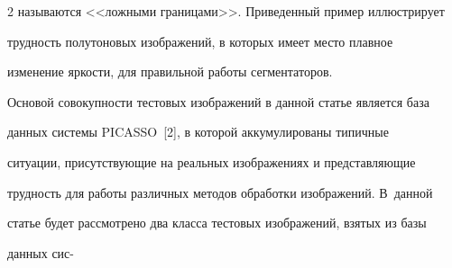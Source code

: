 \begin{multicols}{2}
называются <<ложными границами>>. Приведенный пример иллюстрирует 


трудность полутоновых изображений, в которых имеет место плавное 


изменение яркости, для правильной работы сегментаторов.


  


  Основой совокупности тестовых изображений в данной статье является база 


данных системы \mbox{PICASSO}~[2], в которой аккумулированы типичные 


ситуации, присутствующие на реальных изоб\-ра\-же\-ни\-ях и представляющие 


трудность для работы различных методов обработки изображений. В~данной 


статье будет рассмотрено два класса тес\-то\-вых изоб\-ра\-же\-ний, взятых из базы 


данных сис-\linebreak\vspace*{-12pt}


\pagebreak





\end{multicols}





